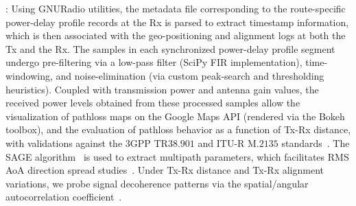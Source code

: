\documentclass[12pt, draftcls, onecolumn]{IEEEtran}
\begin{document}
: Using GNURadio utilities, the metadata file corresponding to the route-specific power-delay profile records at the Rx is parsed to extract timestamp information, which is then associated with the geo-positioning and alignment logs at both the Tx and the Rx. The samples in each synchronized power-delay profile segment undergo pre-filtering via a low-pass filter (SciPy FIR implementation), time-windowing, and noise-elimination (via custom peak-search and thresholding heuristics). Coupled with transmission power and antenna gain values, the received power levels obtained from these processed samples allow the visualization of pathloss maps on the Google Maps API (rendered via the Bokeh toolbox), and the evaluation of pathloss behavior as a function of Tx-Rx distance, with validations against the $3$GPP TR$38.901$ and ITU-R M$.2135$ standards~\cite{MacCartneyModelsOverview}. The SAGE algorithm~\cite{SAGE} is used to extract multipath parameters, which facilitates RMS AoA direction spread studies~\cite{Indoor60G}. Under Tx-Rx distance and Tx-Rx alignment variations, we probe signal decoherence patterns via the spatial/angular autocorrelation coefficient~\cite{MacCartneySpatialStatistics}.
\vspace{-4mm}

\end{document}
